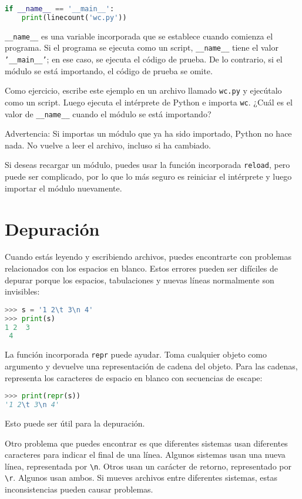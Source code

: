 \begin{lstlisting}[language=Python]
if __name__ == '__main__':
    print(linecount('wc.py'))
\end{lstlisting}

\texttt{\_\_name\_\_} es una variable incorporada que se establece cuando comienza el programa. Si el programa se ejecuta como un script, \texttt{\_\_name\_\_} tiene el valor \texttt{'\_\_main\_\_'}; en ese caso, se ejecuta el código de prueba. De lo contrario, si el módulo se está importando, el código de prueba se omite.

Como ejercicio, escribe este ejemplo en un archivo llamado \texttt{wc.py} y ejecútalo como un script. Luego ejecuta el intérprete de Python e importa \texttt{wc}. ¿Cuál es el valor de \texttt{\_\_name\_\_} cuando el módulo se está importando?

Advertencia: Si importas un módulo que ya ha sido importado, Python no hace nada. No vuelve a leer el archivo, incluso si ha cambiado.

Si deseas recargar un módulo, puedes usar la función incorporada \texttt{reload}, pero puede ser complicado, por lo que lo más seguro es reiniciar el intérprete y luego importar el módulo nuevamente.

\section{Depuración}

Cuando estás leyendo y escribiendo archivos, puedes encontrarte con problemas relacionados con los espacios en blanco. Estos errores pueden ser difíciles de depurar porque los espacios, tabulaciones y nuevas líneas normalmente son invisibles:

\begin{lstlisting}[language=Python]
>>> s = '1 2\t 3\n 4'
>>> print(s)
1 2  3
 4
\end{lstlisting}

La función incorporada \texttt{repr} puede ayudar. Toma cualquier objeto como argumento y devuelve una representación de cadena del objeto. Para las cadenas, representa los caracteres de espacio en blanco con secuencias de escape:

\begin{lstlisting}[language=Python]
>>> print(repr(s))
'1 2\t 3\n 4'
\end{lstlisting}

Esto puede ser útil para la depuración.

Otro problema que puedes encontrar es que diferentes sistemas usan diferentes caracteres para indicar el final de una línea. Algunos sistemas usan una nueva línea, representada por \texttt{\textbackslash n}. Otros usan un carácter de retorno, representado por \texttt{\textbackslash r}. Algunos usan ambos. Si mueves archivos entre diferentes sistemas, estas inconsistencias pueden causar problemas.

